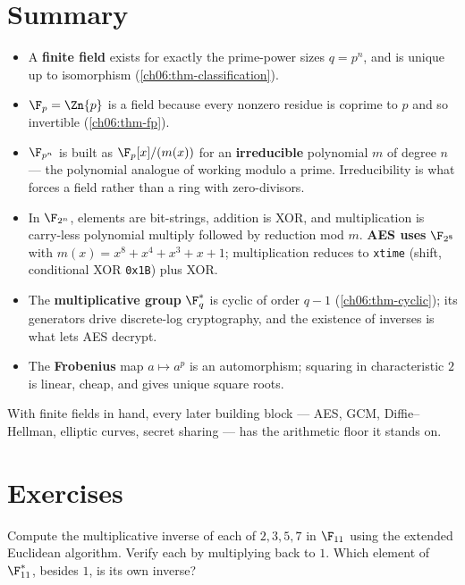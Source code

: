 \section{Summary}
\label{ch06:summary}

\begin{itemize}
  \item A \textbf{finite field} exists for exactly the prime-power sizes
        $q = p^n$, and is unique up to isomorphism
        (\autoref{ch06:thm-classification}).
  \item $\F_p = \Zn{p}$ is a field because every nonzero residue is coprime
        to $p$ and so invertible (\autoref{ch06:thm-fp}).
  \item $\F_{p^n}$ is built as $\F_p[x]/(m(x))$ for an \textbf{irreducible}
        polynomial $m$ of degree $n$ --- the polynomial analogue of working
        modulo a prime. Irreducibility is what forces a field rather than a
        ring with zero-divisors.
  \item In $\F_{2^n}$, elements are bit-strings, addition is XOR, and
        multiplication is carry-less polynomial multiply followed by
        reduction mod $m$. \textbf{AES uses} $\F_{2^8}$ with $m(x) =
        x^8+x^4+x^3+x+1$; multiplication reduces to \texttt{xtime} (shift,
        conditional XOR \texttt{0x1B}) plus XOR.
  \item The \textbf{multiplicative group} $\F_q^{*}$ is cyclic of order
        $q-1$ (\autoref{ch06:thm-cyclic}); its generators drive discrete-log
        cryptography, and the existence of inverses is what lets AES decrypt.
  \item The \textbf{Frobenius} map $a \mapsto a^p$ is an automorphism;
        squaring in characteristic $2$ is linear, cheap, and gives unique
        square roots.
\end{itemize}

With finite fields in hand, every later building block --- AES, GCM,
Diffie--Hellman, elliptic curves, secret sharing --- has the arithmetic floor
it stands on.

\section*{Exercises}

\begin{exercise}[Inverses in $\F_{11}$]
\label{ch06:ex-inv11}
Compute the multiplicative inverse of each of $2,3,5,7$ in $\F_{11}$ using
the extended Euclidean algorithm. Verify each by multiplying back to $1$.
Which element of $\F_{11}^{*}$, besides $1$, is its own inverse?
\end{exercise}

